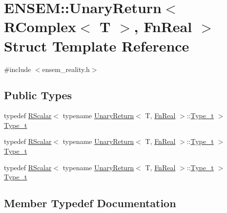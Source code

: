 \hypertarget{structENSEM_1_1UnaryReturn_3_01RComplex_3_01T_01_4_00_01FnReal_01_4}{}\section{E\+N\+S\+EM\+:\+:Unary\+Return$<$ R\+Complex$<$ T $>$, Fn\+Real $>$ Struct Template Reference}
\label{structENSEM_1_1UnaryReturn_3_01RComplex_3_01T_01_4_00_01FnReal_01_4}


{\ttfamily \#include $<$ensem\+\_\+reality.\+h$>$}

\subsection*{Public Types}
\begin{DoxyCompactItemize}
\item 
typedef \mbox{\hyperlink{classENSEM_1_1RScalar}{R\+Scalar}}$<$ typename \mbox{\hyperlink{structENSEM_1_1UnaryReturn}{Unary\+Return}}$<$ T, \mbox{\hyperlink{structENSEM_1_1FnReal}{Fn\+Real}} $>$\+::\mbox{\hyperlink{structENSEM_1_1UnaryReturn_3_01RComplex_3_01T_01_4_00_01FnReal_01_4_a2495b3d7e3cfcf3f84d7bbf892bbfd3c}{Type\+\_\+t}} $>$ \mbox{\hyperlink{structENSEM_1_1UnaryReturn_3_01RComplex_3_01T_01_4_00_01FnReal_01_4_a2495b3d7e3cfcf3f84d7bbf892bbfd3c}{Type\+\_\+t}}
\item 
typedef \mbox{\hyperlink{classENSEM_1_1RScalar}{R\+Scalar}}$<$ typename \mbox{\hyperlink{structENSEM_1_1UnaryReturn}{Unary\+Return}}$<$ T, \mbox{\hyperlink{structENSEM_1_1FnReal}{Fn\+Real}} $>$\+::\mbox{\hyperlink{structENSEM_1_1UnaryReturn_3_01RComplex_3_01T_01_4_00_01FnReal_01_4_a2495b3d7e3cfcf3f84d7bbf892bbfd3c}{Type\+\_\+t}} $>$ \mbox{\hyperlink{structENSEM_1_1UnaryReturn_3_01RComplex_3_01T_01_4_00_01FnReal_01_4_a2495b3d7e3cfcf3f84d7bbf892bbfd3c}{Type\+\_\+t}}
\item 
typedef \mbox{\hyperlink{classENSEM_1_1RScalar}{R\+Scalar}}$<$ typename \mbox{\hyperlink{structENSEM_1_1UnaryReturn}{Unary\+Return}}$<$ T, \mbox{\hyperlink{structENSEM_1_1FnReal}{Fn\+Real}} $>$\+::\mbox{\hyperlink{structENSEM_1_1UnaryReturn_3_01RComplex_3_01T_01_4_00_01FnReal_01_4_a2495b3d7e3cfcf3f84d7bbf892bbfd3c}{Type\+\_\+t}} $>$ \mbox{\hyperlink{structENSEM_1_1UnaryReturn_3_01RComplex_3_01T_01_4_00_01FnReal_01_4_a2495b3d7e3cfcf3f84d7bbf892bbfd3c}{Type\+\_\+t}}
\end{DoxyCompactItemize}


\subsection{Member Typedef Documentation}
\mbox{\label{structENSEM_1_1UnaryReturn_3_01RComplex_3_01T_01_4_00_01FnReal_01_4_a2495b3d7e3cfcf3f84d7bbf892bbfd3c}} 
